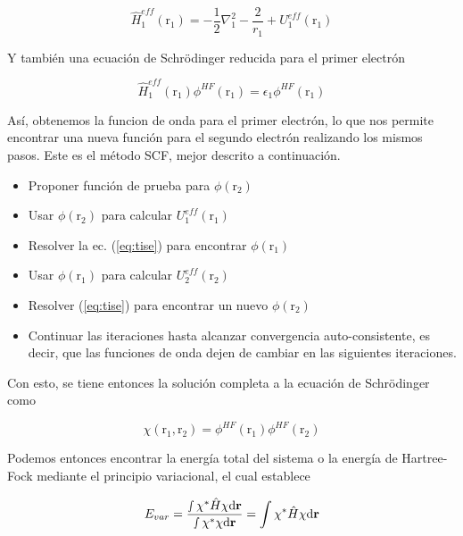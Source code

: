 \documentclass[aps,twocolumn,preprintnumbers]{revtex4}
\begin{document}
  \begin{equation}
    \hat{H}_1^{eff}(\bm{\mathrm{r}}_1) = -\frac{1}{2}\nabla_1^2 - \frac{2}{r_1} + U_1^{eff}(\bm{\mathrm{r}}_1)
  \end{equation}

  Y también una ecuación de Schrödinger reducida para el primer electrón

  \begin{equation}\label{eq:tise}
    \hat{H}_1^{eff}(\bm{\mathrm{r}}_1)\phi^{HF}(\bm{\mathrm{r}}_1) = \epsilon_1\phi^{HF}(\bm{\mathrm{r}}_1)
  \end{equation}

  Así, obtenemos la funcion de onda para el primer electrón, lo que nos permite encontrar una nueva función para el segundo electrón realizando los mismos pasos. Este es el método SCF, mejor descrito a continuación.

  \begin{itemize}
    \item Proponer función de prueba para $\phi(\bm{\mathrm{r}}_2)$
    \item Usar $\phi(\bm{\mathrm{r}}_2)$ para calcular $U_1^{eff}(\bm{\mathrm{r}}_1)$
    \item Resolver la ec. (\ref{eq:tise}) para encontrar $\phi(\bm{\mathrm{r}}_1)$
    \item Usar $\phi(\bm{\mathrm{r}}_1)$ para calcular  $U_2^{eff}(\bm{\mathrm{r}}_2)$
    \item Resolver (\ref{eq:tise}) para encontrar un nuevo $\phi(\bm{\mathrm{r}}_2)$
    \item Continuar las iteraciones hasta alcanzar convergencia auto-consistente, es decir, que las funciones de onda dejen de cambiar en las siguientes iteraciones.
  \end{itemize}

  Con esto, se tiene entonces la solución completa a la ecuación de Schrödinger como

  \begin{equation}
    \chi(\bm{\mathrm{r}}_1,\bm{\mathrm{r}}_2) = \phi^{HF}(\bm{\mathrm{r}}_1)\phi^{HF}(\bm{\mathrm{r}}_2)
  \end{equation}

  Podemos entonces encontrar la energía total del sistema o la energía de Hartree-Fock mediante el principio variacional, el cual establece

  \begin{equation}
    E_{var} = \frac{\smallint\chi^*\hat{H}\chi\mathrm{d}\bm{\mathrm{r}}}{\smallint\chi^*\chi\mathrm{d}\bm{\mathrm{r}}} = \int\chi^*\hat{H}\chi\mathrm{d}\bm{\mathrm{r}}
  \end{equation}
\end{document}
